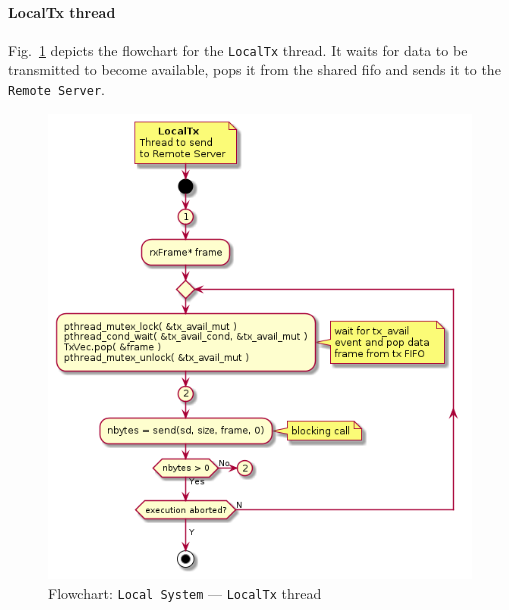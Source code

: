 \paragraph{LocalTx thread}
Fig.~\ref{fig:flow-local-tx} depicts the flowchart for the \texttt{LocalTx}
thread. It waits for data to be transmitted to become available, pops it from
the shared \gls{fifo} and sends it to the \texttt{Remote Server}.
%
\begin{figure}[htb!]
\centering
    \includegraphics[width=0.6\columnwidth]{./img/flow-local-tx.png}
  \caption{Flowchart: \texttt{Local System} --- \texttt{LocalTx} thread}%
\label{fig:flow-local-tx}
\end{figure}
%
